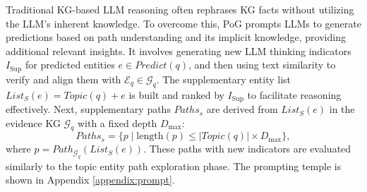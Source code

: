 Traditional KG-based LLM reasoning often rephrases KG facts without utilizing the LLM's inherent knowledge. To overcome this, PoG prompts LLMs to generate predictions based on path understanding and its implicit knowledge, providing additional relevant insights. 
It involves generating new LLM thinking indicators $I_{\text{Sup}}$ for predicted entities $e \in Predict(q)$, and then using text similarity to verify and align them with $\mathcal{E}_q \in \mathcal{G}_q$. 
The supplementary entity list $List_{S}(e) = Topic(q) + e$ is built and ranked by $I_{\text{Sup}}$ to facilitate reasoning effectively. Next, supplementary paths $Paths_{s}$ are derived from $List_{S}(e)$ in the evidence KG $\mathcal{G}_q$ with a fixed depth $D_{\max}$:
\[
Paths_{s} = \{ p \mid \text{length}(p) \leq |Topic(q)| \times D_{\max} \},
\]
where $p = Path_{\mathcal{G}_q}(List_{S}(e))$. These paths with new indicators
are evaluated similarly to the topic entity path exploration phase. The prompting temple is shown in Appendix \ref{appendix:prompt}.



